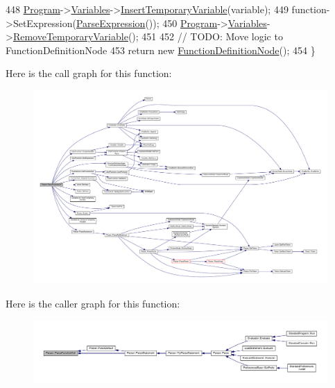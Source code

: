 \begin{DoxyCode}
448     \hyperlink{classProgram}{Program}->\hyperlink{classProgram_a1d4f53befb0270e64c91c24d14061188}{Variables}->\hyperlink{classVariableList_a4e8c2b729d346ff56cf01c5349931c62}{InsertTemporaryVariable}(variable);
449     \textcolor{keyword}{function}->SetExpression(\hyperlink{classParser_ae46b0a87abe76f40ae117c5bdcb2f29d}{ParseExpression}());
450     \hyperlink{classProgram}{Program}->\hyperlink{classProgram_a1d4f53befb0270e64c91c24d14061188}{Variables}->\hyperlink{classVariableList_a489608dbcd6989a9ffd4092234a8052c}{RemoveTemporaryVariable}();
451 
452     \textcolor{comment}{// TODO: Move logic to FunctionDefinitionNode}
453     \textcolor{keywordflow}{return} \textcolor{keyword}{new} \hyperlink{classFunctionDefinitionNode}{FunctionDefinitionNode}();
454 \}
\end{DoxyCode}


Here is the call graph for this function\+:\nopagebreak
\begin{figure}[H]
\begin{center}
\leavevmode
\includegraphics[width=350pt]{classParser_a0e8b1f794af2b9923bc3fcb7498004f9_cgraph}
\end{center}
\end{figure}




Here is the caller graph for this function\+:\nopagebreak
\begin{figure}[H]
\begin{center}
\leavevmode
\includegraphics[width=350pt]{classParser_a0e8b1f794af2b9923bc3fcb7498004f9_icgraph}
\end{center}
\end{figure}


